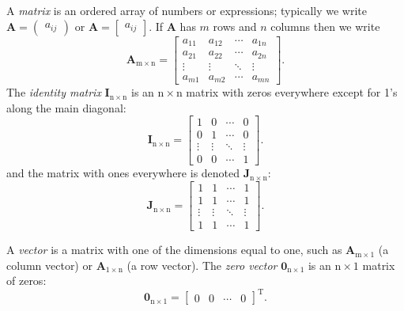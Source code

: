 \documentclass[captions=tableheading]{scrbook}
\begin{document}
A \emph{matrix} is an ordered array of numbers or expressions; typically we write \(\mathbf{A}=\begin{pmatrix}a_{ij}\end{pmatrix}\) or \(\mathbf{A}=\begin{bmatrix}a_{ij}\end{bmatrix}\). If \(\mathbf{A}\) has \(m\) rows and \(n\) columns then we write
\begin{equation}
\mathbf{A}_{\mathrm{m}\times\mathrm{n}}=\begin{bmatrix}a_{11} & a_{12} & \cdots & a_{1n}\\
a_{21} & a_{22} & \cdots & a_{2n}\\
\vdots & \vdots & \ddots & \vdots\\
a_{m1} & a_{m2} & \cdots & a_{mn}\end{bmatrix}.
\end{equation}
The \emph{identity matrix} \(\mathbf{I}_{\mathrm{n}\times\mathrm{n}}\) is an \(\mathrm{n}\times\mathrm{n}\) matrix with zeros everywhere except for 1's along the main diagonal: 
\begin{equation}
\mathbf{I}_{\mathrm{n}\times\mathrm{n}}=\begin{bmatrix}1 & 0 & \cdots & 0\\
0 & 1 & \cdots & 0\\
\vdots & \vdots & \ddots & \vdots\\
0 & 0 & \cdots & 1\end{bmatrix}.
\end{equation}
and the matrix with ones everywhere is denoted \(\mathbf{J}_{\mathrm{n}\times\mathrm{n}}\):
\begin{equation}
\mathbf{J}_{\mathrm{n}\times\mathrm{n}}=\begin{bmatrix}1 & 1 & \cdots & 1\\
1 & 1 & \cdots & 1\\
\vdots & \vdots & \ddots & \vdots\\
1 & 1 & \cdots & 1\end{bmatrix}.
\end{equation}

A \emph{vector} is a matrix with one of the dimensions equal to one, such as \(\mathbf{A}_{\mathrm{m}\times1}\) (a column vector) or \(\mathbf{A}_{\mathrm{1}\times\mathrm{n}}\) (a row vector). The \emph{zero vector} \(\mathbf{0}_{\mathrm{n}\times1}\)
is an \(\mathrm{n}\times1\) matrix of zeros:
\begin{equation}
\mathbf{0}_{\mathrm{n}\times1}=\begin{bmatrix}0 & 0 & \cdots & 0\end{bmatrix}^{\mathrm{T}}.
\end{equation}
\end{document}
